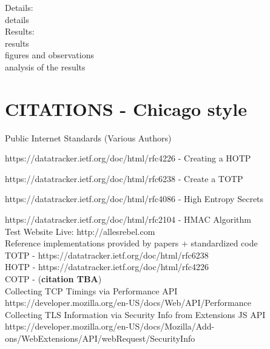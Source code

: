 \documentclass[a4paper, 11pt]{article} 				%
\begin{document}
\noindent
Details:\\
details\\

\noindent
Results:\\
results\\
figures and observations\\
analysis of the results\\






\section{CITATIONS - Chicago style} %
\noindent
Public Internet Standards (Various Authors)

\noindent
https://datatracker.ietf.org/doc/html/rfc4226 - Creating a HOTP

\noindent
https://datatracker.ietf.org/doc/html/rfc6238 - Create a TOTP 

\noindent
https://datatracker.ietf.org/doc/html/rfc4086 - High Entropy Secrets

\noindent
https://datatracker.ietf.org/doc/html/rfc2104 - HMAC Algorithm\\

\noindent
Test Website Live: http://allesrebel.com\\ 

\noindent
Reference implementations provided by papers + standardized code\\
TOTP - https://datatracker.ietf.org/doc/html/rfc6238\\
HOTP - https://datatracker.ietf.org/doc/html/rfc4226 \\
COTP - (\textbf{citation TBA})\\

\noindent
Collecting TCP Timings via Performance API\\
https://developer.mozilla.org/en-US/docs/Web/API/Performance\\
Collecting TLS Information via Security Info from Extensions JS API\\
https://developer.mozilla.org/en-US/docs/Mozilla/Add-ons/WebExtensions/API/webRequest/SecurityInfo\\
\end{document}
